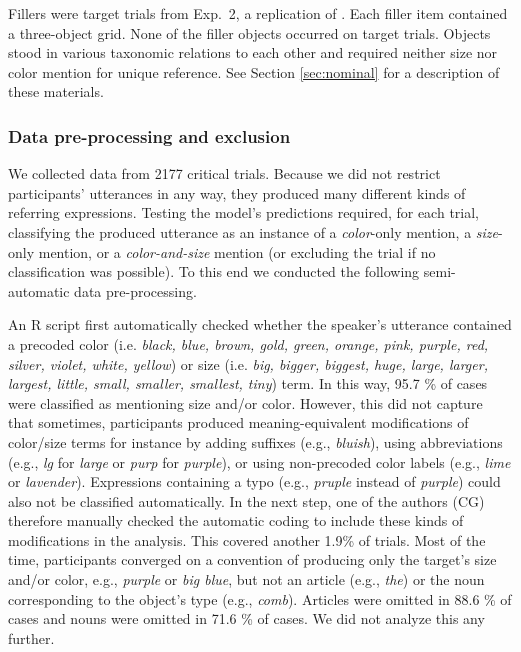 \documentclass[11pt]{article}
\newcommand{\sectionref}[1]{Section \ref{#1}}
\begin{document}
Fillers were target trials from Exp.~2, a replication of . Each filler item contained a three-object grid. None of the filler objects occurred on target trials. Objects stood in various taxonomic relations to each other and required neither size nor color mention for unique reference. See \sectionref{sec:nominal} for a description of these materials.

\subsubsection{Data pre-processing and exclusion}

We collected data from 2177 critical trials. Because we did not restrict participants' utterances in any way, they produced many different kinds of referring expressions. Testing the model's predictions required, for each trial, classifying the produced utterance as an instance of a \emph{color}-only mention, a \emph{size}-only mention, or a \emph{color-and-size} mention (or excluding the trial if no classification was possible). To this end we conducted the following semi-automatic data pre-processing. 

An R script first automatically checked whether the speaker's utterance contained a precoded color (i.e. \emph{black, blue, brown, gold, green, orange, pink, purple, red, silver, violet, white, yellow}) or size (i.e. \emph{big, bigger, biggest, huge, large, larger, largest, little, small, smaller, smallest, tiny}) term. In this way, 95.7 \% of cases were classified as mentioning size and/or color. However, this did not capture that sometimes, participants produced meaning-equivalent modifications of color/size terms for instance by adding suffixes (e.g., \emph{bluish}), using abbreviations (e.g., \emph{lg} for \emph{large} or \emph{purp} for \emph{purple}), or using non-precoded color labels (e.g., \emph{lime} or \emph{lavender}). Expressions containing a typo (e.g., \emph{pruple} instead of \emph{purple}) could also not be classified automatically. In the next step, one of the authors (CG) therefore manually checked the automatic coding to include these kinds of modifications in the analysis. This covered another 1.9\% of trials. Most of the time, participants converged on a convention of producing only the target's size and/or color, e.g., \emph{purple} or \emph{big blue}, but not an article (e.g., \emph{the}) or the noun corresponding to the object's type  (e.g., \emph{comb}). Articles were omitted in 88.6 \% of cases and nouns were omitted in 71.6 \% of cases. We did not analyze this any further.
\end{document}

